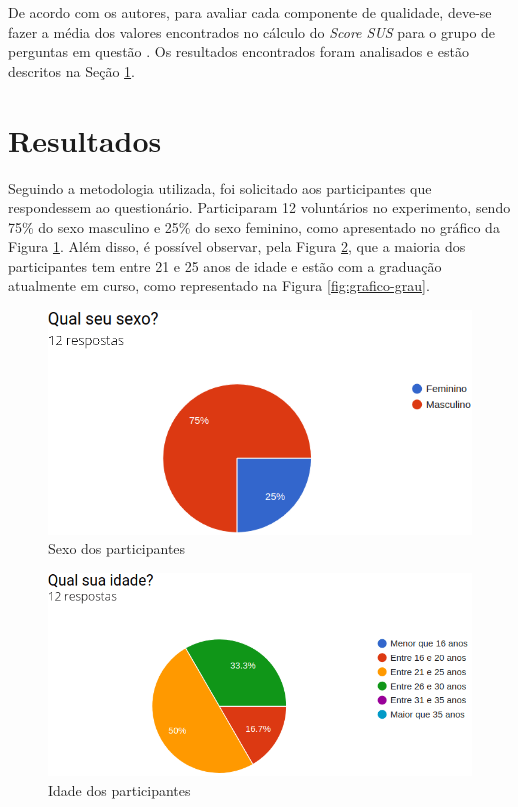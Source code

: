 \par 
De acordo com os autores, para avaliar cada componente de qualidade, deve-se fazer a média dos valores encontrados no cálculo do \textit{Score SUS} para o grupo de perguntas 
em questão \cite{nielsen199510}. Os resultados encontrados foram analisados e estão descritos na Seção \ref{sec:resultados}. 

\section{Resultados}
\label{sec:resultados}

Seguindo a metodologia utilizada, foi solicitado aos participantes que respondessem ao questionário. Participaram 12 voluntários no experimento, sendo 75\% do sexo masculino e 25\% do sexo feminino, como apresentado no gráfico da Figura \ref{fig:grafico-sexo}. Além disso, 
é possível observar, pela Figura \ref{fig:grafico-idade}, que a maioria dos participantes tem entre 21 e 25 anos de idade e 
estão com a graduação atualmente em curso, como representado na Figura \ref{fig:grafico-grau}.

\begin{figure}[!ht]
    \centering
    \includegraphics[scale=0.4]{./figuras/sexo.png}
    \caption{Sexo dos participantes}
    \label{fig:grafico-sexo}
\end{figure}

\begin{figure}[!ht]
    \centering
    \includegraphics[scale=0.4]{./figuras/idade.png}
    \caption{Idade dos participantes}
    \label{fig:grafico-idade}
\end{figure}

